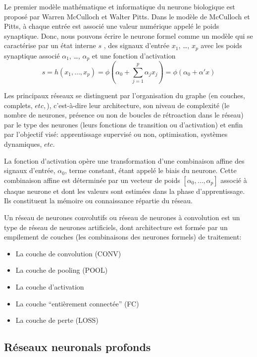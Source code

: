 \documentclass[
  11pt,
  dvipsnames]{article}
\providecommand{\tightlist}{%
  \setlength{\itemsep}{0pt}\setlength{\parskip}{0pt}}
\begin{document}
Le premier modèle mathématique et informatique du neurone biologique est proposé par Warren McCulloch et Walter Pitts. Dans le modèle de McCulloch et Pitts, à chaque entrée est associé une valeur numérique appelé le poids synaptique.
Donc, nous pouvons écrire le neurone formel comme un modèle qui se caractérise par
un état interne \(s\) , des signaux d'entrée \(x_{1}\), \dots, \(x_{p}\) avec les poids synaptique associé
\(\alpha_{1}\), \dots, \(\alpha_{p}\) et une fonction d'activation
\[ s=h(x_{1},\dots,x_{p})=\phi(\alpha_{0} + \sum_{j=1}^{p} \alpha_{j}x_{j}) = \phi(\alpha_{0} + \alpha' x)\]

Les principaux réseaux se distinguent par l'organisation du graphe (en couches, complets, \(etc,\)), c'est-à-dire leur architecture, son niveau de complexité (le nombre de neurones, présence ou non de boucles de rétroaction dans le réseau) par le type des neurones (leurs fonctions de transition ou d'activation) et enfin par l'objectif visé: apprentissage supervisé ou non, optimisation, systèmes dynamiques, \(etc.\)

La fonction d'activation opère une transformation d'une combinaison affine
des signaux d'entrée, \(\alpha_{0}\), terme constant, étant appelé le biais du neurone.
Cette combinaison affine est déterminée par un vecteur de poids \([\alpha_{0},\dots,\alpha_{p}]\) associé à chaque neurone et dont les valeurs sont estimées dans la phase d'apprentissage.
Ils constituent la mémoire ou connaissance répartie du réseau.

Un réseau de neurones convolutifs ou réseau de neurones à convolution
est un type de réseau de neurones artificiels, dont architecture est formée par
un empilement de couches (les combinaisons des neurones formels) de traitement:

\begin{itemize}
\tightlist
\item
  La couche de convolution (CONV)
\item
  La couche de pooling (POOL)
\item
  La couche d'activation
\item
  La couche ``entièrement connectée'' (FC)
\item
  La couche de perte (LOSS)
\end{itemize}

\hypertarget{ruxe9seaux-neuronals-profonds}{%
\subsection{Réseaux neuronals profonds}\label{ruxe9seaux-neuronals-profonds}}
\end{document}
